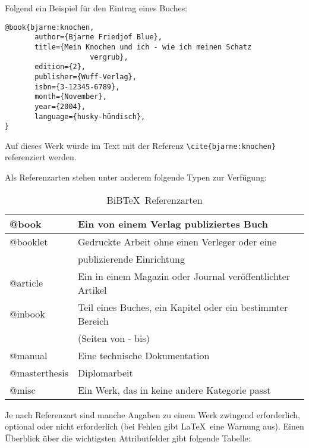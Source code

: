 Folgend ein Beispiel für den Eintrag eines Buches:

\begin{verbatim}
@book{bjarne:knochen,
       author={Bjarne Friedjof Blue},
       title={Mein Knochen und ich - wie ich meinen Schatz
       				vergrub},
       edition={2},
       publisher={Wuff-Verlag},
       isbn={3-12345-6789},
       month={November},
       year={2004},
       language={husky-hündisch},
}
\end{verbatim}

Auf dieses Werk würde im Text mit der Referenz \verb|\cite{bjarne:knochen}| referenziert
werden.

Als Referenzarten stehen unter anderem folgende Typen zur Verfügung:

\begin{table}[h]
	\centering
		\begin{tabular}[t]{|l|l|}
		\hline
		@book &Ein von einem Verlag publiziertes Buch\\
		\hline
		@booklet &Gedruckte Arbeit ohne einen Verleger oder eine\\
		 				&publizierende Einrichtung\\
		\hline
		@article &Ein in einem Magazin oder Journal veröffentlichter Artikel\\
		\hline
		@inbook &Teil eines Buches, ein Kapitel oder ein bestimmter Bereich\\
						&(Seiten von - bis)\\
		\hline
		@manual &Eine technische Dokumentation\\
		\hline
		@masterthesis &Diplomarbeit\\
		\hline
		@misc &Ein Werk, das in keine andere Kategorie passt\\
		\hline
		\end{tabular}
	\caption{BiB\TeX \ Referenzarten}
	\label{tab:BiBTeXReferenzarten}
\end{table}

\newpage

Je nach Referenzart sind manche Angaben zu einem Werk zwingend erforderlich,
optional oder nicht erforderlich (bei Fehlen gibt \LaTeX \ eine Warnung aus).
Einen Überblick über die wichtigsten Attributfelder gibt folgende Tabelle:

